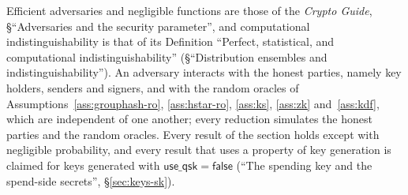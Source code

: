 \documentclass[11pt,a4paper]{article}
\theoremstyle{definition}
\begin{document}
Efficient adversaries and negligible functions are those of the
\emph{Crypto Guide}, \S``Adversaries and the security parameter'', and
computational indistinguishability is that of its Definition ``Perfect,
statistical, and computational indistinguishability'' (\S``Distribution
ensembles and indistinguishability''). An adversary interacts with the
honest parties, namely key holders, senders and signers, and with the random
oracles of Assumptions~\ref{ass:grouphash-ro}, \ref{ass:hstar-ro},
\ref{ass:ks}, \ref{ass:zk} and~\ref{ass:kdf}, which are independent of one
another; every reduction simulates the honest parties and the random
oracles. Every result of the section holds except with negligible
probability, and every result that uses a property of key generation is
claimed for keys generated with $\mathsf{use\_qsk} = \mathsf{false}$ (``The
spending key and the spend-side secrets'', \S\ref{sec:keys-sk}).
\end{document}

